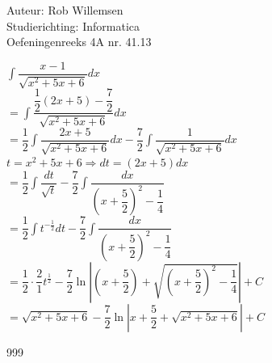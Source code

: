 \documentclass[a4paper]{article}
\newcommand{\dint}{\displaystyle\int}
\begin{document}
\noindent \large Auteur: Rob Willemsen \\
\noindent \large Studierichting: Informatica \\
\noindent \large Oefeningenreeks 4A nr. 41.13 \\

\medskip

\normalsize

$\dint \dfrac{x-1}{\sqrt{x^2+5x+6}}dx $ \\

$= \dint \dfrac{\dfrac{1}{2}(2x+5)-\dfrac{7}{2}}{\sqrt{x^2+5x+6}}dx $ \\

$=\dfrac{1}{2} \dint \dfrac{2x+5}{\sqrt{x^2+5x+6}}dx - \dfrac{7}{2} \dint \dfrac{1}{\sqrt{x^2+5x+6}}dx $ \\

$t = x^2+5x+6 \Rightarrow dt = (2x+5)dx$ \\

$= \dfrac{1}{2} \dint \dfrac{dt}{\sqrt{t}} - \dfrac{7}{2} \dint \dfrac{dx}{\left(x+\dfrac{5}{2}\right)^2-\dfrac{1}{4}}$ \\

$= \dfrac{1}{2} \dint t^{-\tfrac{1}{2}} dt - \dfrac{7}{2} \dint \dfrac{dx}{\left(x+\dfrac{5}{2}\right)^2-\dfrac{1}{4}}$ \\

$= \dfrac{1}{2} \cdot \dfrac{2}{1} t^{\tfrac{1}{2}} - \dfrac{7}{2} \ln \left|\left(x+\dfrac{5}{2}\right) + \sqrt{\left(x+\dfrac{5}{2}\right)^2 - \dfrac{1}{4}}\right| + C$ \\

$= \sqrt{x^2+5x+6} - \dfrac{7}{2} \ln \left|x+\dfrac{5}{2} + \sqrt{x^2+5x+6}\right| + C$ \\

\begin{thebibliography}{999}
\end{thebibliography}
\end{document}
